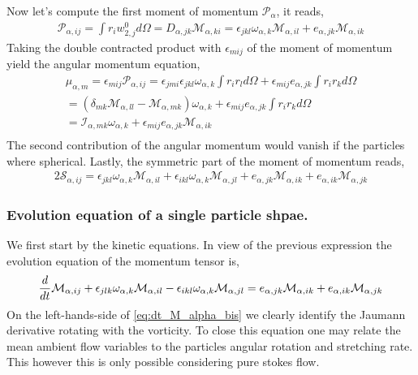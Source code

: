 Now let's compute the first moment of momentum $\mathcal{P}_\alpha$, it reads, 
\begin{align*}
    \mathcal{P}_{\alpha,ij}
    = \int r_i w_{2,j}^0 d\Omega
    = D_{\alpha,jk} \mathcal{M}_{\alpha,ki}
    = \epsilon_{jkl} \omega_{\alpha,k} \mathcal{M}_{\alpha,il}
    +  e_{\alpha,jk} \mathcal{M}_{\alpha,ik}
\end{align*}
Taking the double contracted product with $\epsilon_{mij}$ of the moment of momentum yield the angular momentum equation, 
\begin{align*}
    \mu_{\alpha,m}
    = \epsilon_{mij}\mathcal{P}_{\alpha,ij}
    = \epsilon_{jmi} \epsilon_{jkl} \omega_{\alpha,k} \int r_i r_l  d\Omega
    +  \epsilon_{mij} e_{\alpha,jk} \int r_i r_k  d\Omega\\
    = (\delta_{mk}\mathcal{M}_{\alpha,ll} - \mathcal{M}_{\alpha,mk}) \omega_{\alpha,k}
    +  \epsilon_{mij} e_{\alpha,jk} \int r_i r_k  d\Omega\\
    = \mathcal{I}_{\alpha,mk} \omega_{\alpha,k}
    +  \epsilon_{mij} e_{\alpha,jk} \mathcal{M}_{\alpha,ik}\\
\end{align*}
The second contribution of the angular momentum would vanish if the particles where spherical. 
Lastly, the symmetric part of the moment of momentum reads, 
\begin{align*}
    2\mathcal{S}_{\alpha,ij}
    = \epsilon_{jkl} \omega_{\alpha,k} \mathcal{M}_{\alpha,il}
    + \epsilon_{ikl} \omega_{\alpha,k} \mathcal{M}_{\alpha,jl}
    +  e_{\alpha,jk} \mathcal{M}_{\alpha,ik}
    +  e_{\alpha,ik}  \mathcal{M}_{\alpha,jk}
\end{align*}

\subsubsection*{Evolution equation of a single particle shpae.}

We first start by the kinetic equations.  
In view of the previous expression the evolution equation of the momentum tensor is,  
\begin{equation*}
    \frac{d}{d t} \mathcal{M}_{\alpha,ij}
    + \epsilon_{jlk} \omega_{\alpha,k} \mathcal{M}_{\alpha,il}
    - \epsilon_{ikl} \omega_{\alpha,k} \mathcal{M}_{\alpha,jl}
     =  e_{\alpha,jk} \mathcal{M}_{\alpha,ik}
     +  e_{\alpha,ik}  \mathcal{M}_{\alpha,jk}
     \label{eq:dt_M_alpha_bis}
\end{equation*}
On the left-hands-side of \ref{eq:dt_M_alpha_bis} we clearly identify the Jaumann derivative rotating with the vorticity.
To close this equation one may relate the mean ambient flow variables to the particles angular rotation and stretching rate. 
This however this is only possible considering pure stokes flow.


